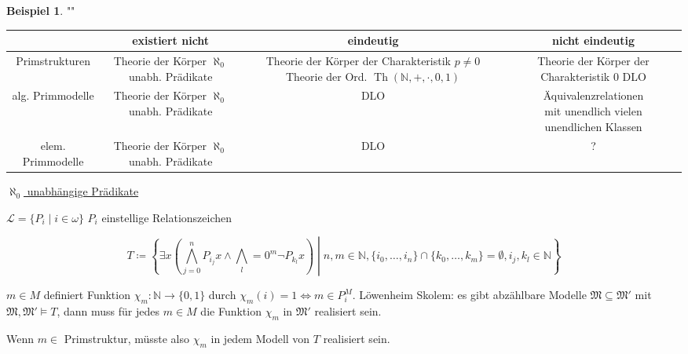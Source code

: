 \documentclass[12pt,parskip=full]{scrartcl}
\newcommand{\setN}{\mathbb{N}}
\newcommand{\heading}{\underline}
\theoremstyle{definition}
\newtheorem{example}[theorem]{Beispiel}
\begin{document}
	\begin{example}""
		
		\begin{tabular}{|c|c|c|c|}
			\hline 
			& existiert nicht & eindeutig & nicht eindeutig \\ 
			\hline 
			Primstrukturen & \shortstack{Theorie der Körper \\ \\ $\aleph_0$ unabh. Prädikate}  & \shortstack{Theorie der Körper \\ der Charakteristik \\ $p \neq 0$ \\ \\ Theorie der Ord. \\ \\ $\operatorname{Th}(\setN, +, \cdot, 0, 1)$} & \shortstack{Theorie der Körper \\ der Charakteristik $0$ \\ \\ DLO} \\ 
			\hline 
			alg. Primmodelle & \shortstack{Theorie der Körper \\ \\ $\aleph_0$ unabh. Prädikate} & DLO & \shortstack{Äquivalenzrelationen \\ mit unendlich vielen \\ unendlichen Klassen} \\ 
			\hline 
			elem. Primmodelle & \shortstack{Theorie der Körper \\ \\ $\aleph_0$ unabh. Prädikate} & DLO & ? \\ 
			\hline 
		\end{tabular}
	
		\heading{$\aleph_0$ unabhängige Prädikate}
		
		$\mathcal{L} = \{ P_i \mid i \in \omega \}$ $P_i$ einstellige Relationszeichen
		
		\begin{equation*}
			T \coloneqq \left\{ \exists x \left( \bigwedge_{j=0}^n P_{i_j} x \land \bigwedge_l=0^m \lnot P_{k_l} x \right) \middle| n,m \in \setN, \{i_0, \dots, i_n \} \cap \{ k_0, \dots, k_m \} = \emptyset, i_j, k_l \in \setN  \right\}
		\end{equation*}
		
		$m \in M$ definiert Funktion $\chi_m: \setN \to \{ 0,1 \}$ durch $\chi_m(i) = 1 \Leftrightarrow m \in P_i^M$. Löwenheim Skolem: es gibt abzählbare Modelle $\mathfrak{M} \subseteq \mathfrak{M}'$ mit $\mathfrak{M}, \mathfrak{M}' \models T$, dann muss für jedes $m \in M$ die Funktion $\chi_m$ in $\mathfrak{M}'$ realisiert sein.
		
		Wenn $m \in$ Primstruktur, müsste also $\chi_m$ in jedem Modell von $T$ realisiert sein.	
	\end{example}
\end{document}
